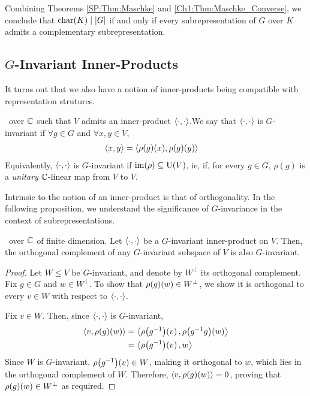 Combining Theorems \ref{SP:Thm:Maschke} and \ref{Ch1:Thm:Maschke_Converse}, we conclude that $\operatorname{char}\!\left( K \right) \mid \left\lvert G \right\rvert$ if and only if every subrepresentation of $G$ over $K$ admits a complementary subrepresentation.

\subsection{$G$-Invariant Inner-Products}

It turns out that we also have a notion of inner-products being compatible with representation strutures.

\begin{boxdefinition}
    \ over $\mathbb{C}$ such that $V$ admits an inner-product $\left\langle \cdot, \cdot \right\rangle$.We say that $\left\langle \cdot, \cdot \right\rangle$ is $G$-invariant if $\forall g \in G$ and $\forall x, y \in V$,
    \begin{align*}
        \left\langle x,y \right\rangle &= \left\langle \rho(g)(x), \rho(g)(y) \right\rangle
    \end{align*}
    Equivalently, $\left\langle \cdot, \cdot \right\rangle$ is $G$-invariant if $\operatorname{im}\!\left( \rho \right) \subseteq \operatorname{U}\!\left( V \right)$, ie, if, for every $g \in G$, $\rho(g)$ is a \textit{unitary} $\mathbb{C}$-linear map from $V$ to $V$.
\end{boxdefinition}

Intrinsic to the notion of an inner-product is that of orthogonality. In the following proposition, we understand the significance of $G$-invariance in the context of subrepresentations.

\begin{proposition} \label{Ch1:Prop:Orth_Compl_of_Inv_Inv}
    \ over $\mathbb{C}$ of finite dimension. Let $\left\langle \cdot, \cdot \right\rangle$ be a $G$-invariant inner-product on $V$. Then, the orthogonal complement of any $G$-invariant subspace of $V$ is also $G$-invariant.
\end{proposition}
\begin{proof}
    Let $W \leq V$ be $G$-invariant, and denote by $W^\perp$ its orthogonal complement. Fix $g \in G$ and $w \in W^\perp$. To show that $\rho\!\left( g \right)\!\left( w \right) \in W^\perp$, we show it is orthogonal to every $v \in W$ with respect to $\left\langle \cdot, \cdot \right\rangle$.

    Fix $v \in W$. Then, since $\left\langle \cdot, \cdot \right\rangle$ is $G$-invariant,
    \begin{align*}
        \cycl{v, \rhoff{g}{w}} &= \cycl{\rhoff{g\inv}{v}, \rhoff{g\inv g}{w}} \\
        &= \cycl{\rhoff{g\inv}{v}, w}
    \end{align*}
    Since $W$ is $G$-invariant, $\rho\!\left( g^{-1} \right)\!\left( v \right) \in W$, making it orthogonal to $w$, which lies in the orthogonal complement of $W$. Therefore, $\left\langle v, \rho\!\left( g \right)\!\left( w \right) \right\rangle = 0$, proving that $\rho\!\left( g \right)\!\left( w \right) \in W^\perp$ as required.
\end{proof}

